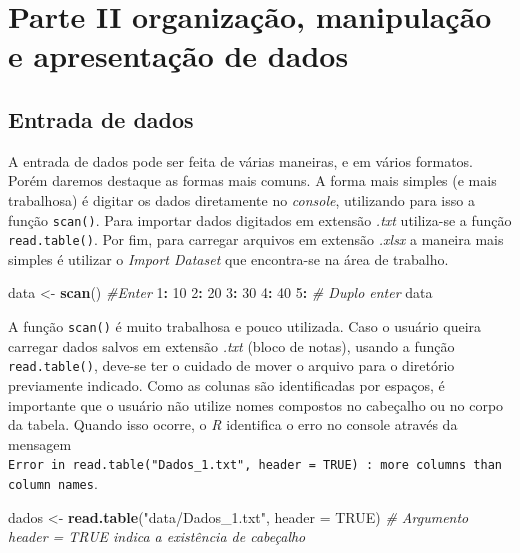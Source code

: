 \documentclass[
]{book}
\newenvironment{Shaded}{\begin{snugshade}}{\end{snugshade}}
\newcommand{\CommentTok}[1]{\textcolor[rgb]{0.56,0.35,0.01}{\textit{#1}}}
\newcommand{\DataTypeTok}[1]{\textcolor[rgb]{0.13,0.29,0.53}{#1}}
\newcommand{\DecValTok}[1]{\textcolor[rgb]{0.00,0.00,0.81}{#1}}
\newcommand{\KeywordTok}[1]{\textcolor[rgb]{0.13,0.29,0.53}{\textbf{#1}}}
\newcommand{\NormalTok}[1]{#1}
\newcommand{\OperatorTok}[1]{\textcolor[rgb]{0.81,0.36,0.00}{\textbf{#1}}}
\newcommand{\OtherTok}[1]{\textcolor[rgb]{0.56,0.35,0.01}{#1}}
\newcommand{\StringTok}[1]{\textcolor[rgb]{0.31,0.60,0.02}{#1}}
\begin{document}
\hypertarget{part-parte-ii-organizauxe7uxe3o-manipulauxe7uxe3o-e-apresentauxe7uxe3o-de-dados}{%
\part{Parte II organização, manipulação e apresentação de dados}\label{part-parte-ii-organizauxe7uxe3o-manipulauxe7uxe3o-e-apresentauxe7uxe3o-de-dados}}

\hypertarget{entrada}{%
\chapter{Entrada de dados}\label{entrada}}

A entrada de dados pode ser feita de várias maneiras, e em vários formatos. Porém daremos destaque as formas mais comuns. A forma mais simples (e mais trabalhosa) é digitar os dados diretamente no \emph{console}, utilizando para isso a função \texttt{scan()}.  Para importar dados digitados em extensão \emph{.txt} utiliza-se a função \texttt{read.table()}.  Por fim, para carregar arquivos em extensão \emph{.xlsx} a maneira mais simples é utilizar o \emph{Import Dataset} que encontra-se na área de trabalho.

\begin{Shaded}
\begin{Highlighting}[]
\NormalTok{data <-}\StringTok{ }\KeywordTok{scan}\NormalTok{() }\CommentTok{#Enter}
\DecValTok{1}\OperatorTok{:}\StringTok{ }\DecValTok{10}
\DecValTok{2}\OperatorTok{:}\StringTok{ }\DecValTok{20}
\DecValTok{3}\OperatorTok{:}\StringTok{ }\DecValTok{30}
\DecValTok{4}\OperatorTok{:}\StringTok{ }\DecValTok{40}
\DecValTok{5}\OperatorTok{:}\StringTok{ }\CommentTok{# Duplo enter}
\NormalTok{data}
\end{Highlighting}
\end{Shaded}

A função \texttt{scan()} é muito trabalhosa e pouco utilizada. Caso o usuário queira carregar dados salvos em extensão \emph{.txt} (bloco de notas), usando a função \texttt{read.table()}, deve-se ter o cuidado de mover o arquivo para o diretório previamente indicado. Como as colunas são identificadas por espaços, é importante que o usuário não utilize nomes compostos no cabeçalho ou no corpo da tabela. Quando isso ocorre, o \emph{R} identifica o erro no console através da mensagem \texttt{Error\ in\ read.table("Dados\_1.txt",\ header\ =\ TRUE)\ :\ more\ columns\ than\ column\ names}.

\begin{Shaded}
\begin{Highlighting}[]
\NormalTok{dados <-}\StringTok{ }\KeywordTok{read.table}\NormalTok{(}\StringTok{"data/Dados_1.txt"}\NormalTok{, }\DataTypeTok{header =} \OtherTok{TRUE}\NormalTok{)}
\CommentTok{# Argumento header = TRUE indica a existência de cabeçalho}
\end{Highlighting}
\end{Shaded}
\end{document}
